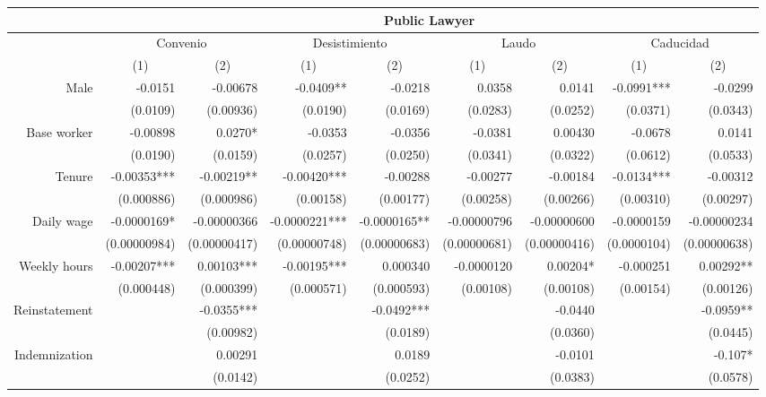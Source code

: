 \begin{tabular}{rrrrrrrrr}
\toprule
      & \multicolumn{8}{c}{Public Lawyer} \\
\midrule
      & \multicolumn{2}{c}{Convenio} & \multicolumn{2}{c}{Desistimiento} & \multicolumn{2}{c}{Laudo} & \multicolumn{2}{c}{Caducidad} \\
      & \multicolumn{1}{c}{(1)} & \multicolumn{1}{c}{(2)} & \multicolumn{1}{c}{(1)} & \multicolumn{1}{c}{(2)} & \multicolumn{1}{c}{(1)} & \multicolumn{1}{c}{(2)} & \multicolumn{1}{c}{(1)} & \multicolumn{1}{c}{(2)} \\
Male  & -0.0151 & -0.00678 & -0.0409** & -0.0218 & 0.0358 & 0.0141 & -0.0991*** & -0.0299 \\
      & (0.0109) & (0.00936) & (0.0190) & (0.0169) & (0.0283) & (0.0252) & (0.0371) & (0.0343) \\
Base worker & -0.00898 & 0.0270* & -0.0353 & -0.0356 & -0.0381 & 0.00430 & -0.0678 & 0.0141 \\
      & (0.0190) & (0.0159) & (0.0257) & (0.0250) & (0.0341) & (0.0322) & (0.0612) & (0.0533) \\
Tenure & -0.00353*** & -0.00219** & -0.00420*** & -0.00288 & -0.00277 & -0.00184 & -0.0134*** & -0.00312 \\
      & (0.000886) & (0.000986) & (0.00158) & (0.00177) & (0.00258) & (0.00266) & (0.00310) & (0.00297) \\
Daily wage & -0.0000169* & -0.00000366 & -0.0000221*** & -0.0000165** & -0.00000796 & -0.00000600 & -0.0000159 & -0.00000234 \\
      & (0.00000984) & (0.00000417) & (0.00000748) & (0.00000683) & (0.00000681) & (0.00000416) & (0.0000104) & (0.00000638) \\
Weekly hours & -0.00207*** & 0.00103*** & -0.00195*** & 0.000340 & -0.0000120 & 0.00204* & -0.000251 & 0.00292** \\
      & (0.000448) & (0.000399) & (0.000571) & (0.000593) & (0.00108) & (0.00108) & (0.00154) & (0.00126) \\
Reinstatement &       & -0.0355*** &       & -0.0492*** &       & -0.0440 &       & -0.0959** \\
      &       & (0.00982) &       & (0.0189) &       & (0.0360) &       & (0.0445) \\
Indemnization &       & 0.00291 &       & 0.0189 &       & -0.0101 &       & -0.107* \\
      &       & (0.0142) &       & (0.0252) &       & (0.0383) &       & (0.0578) \\

\end{tabular}
